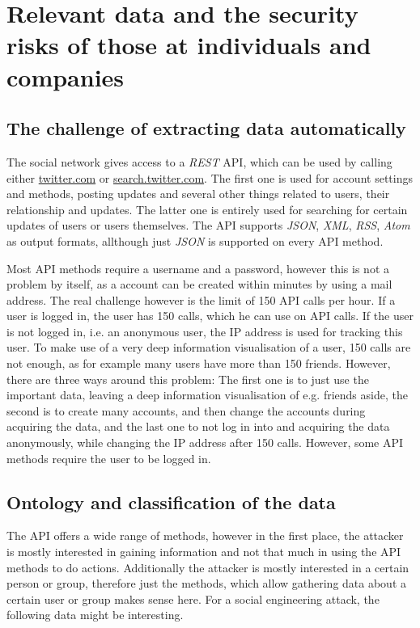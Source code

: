 \section{Relevant data and the security risks of those at individuals and companies}

\subsection{The challenge of extracting data automatically}

The \Twitter{} social network gives access to a \textit{REST} API, which can be
used by calling either \url{twitter.com} or \url{search.twitter.com}. The
first one is used for account settings and methods, posting updates and several
other things related to users, their relationship and updates. The latter one
is entirely used for searching for certain updates of users or users
themselves. The API supports \textit{JSON}, \textit{XML}, \textit{RSS},
\textit{Atom} as output formats, allthough just \textit{JSON} is supported on
every API method.

Most API methods require a username and a password, however this is not a
problem by itself, as a \Twitter{} account can be created within minutes by
using a mail address. The real challenge however is the limit of 150 API calls
per hour. If a user is logged in, the user has 150 calls, which he can use on
API calls. If the user is not logged in, i.e. an anonymous user, the IP address
is used for tracking this user. To make use of a very deep information
visualisation of a user, 150 calls are not enough, as for example many users
have more than 150 friends. However, there are three ways around this problem:
The first one is to just use the important data, leaving a deep information
visualisation of e.g. friends aside, the second is to create many accounts, and
then change the accounts during acquiring the data, and the last one to not log
in into \Twitter{} and acquiring the data anonymously, while changing the IP
address after 150 calls. However, some API methods require the user to be
logged in.

\subsection{Ontology and classification of the data}

The \Twitter{} API offers a wide range of methods, however in the first place,
the attacker is mostly interested in gaining information and not that much in
using the API methods to do actions. Additionally the attacker is mostly
interested in a certain person or group, therefore just the methods, which
allow gathering data about a certain user or group makes sense here. For a
social engineering attack, the following data might be interesting.

